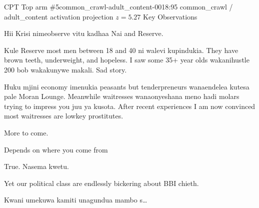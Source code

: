 \begin{docbox}{CPT Top arm \#5}{common\_crawl-adult\_content-0018:95 \textbullet{} common\_crawl / adult\_content \textbullet{} activation projection $z=5.27$}
Key Observations\par Hii Krisi nimeobserve vitu kadhaa Nai and Reserve.\par Kule Reserve most men between 18 and 40 ni walevi kupindukia. They have brown teeth, underweight, and hopeless. I saw some 35+ year olds wakanihustle 200 bob wakakunywe makali. Sad story.\par Huku mjini economy imenukia peasants but tenderpreneurs wanaendelea kutesa pale Moran Lounge. Meanwhile waitresses wanaonyeshana meno hadi molars trying to impress you juu ya kusota. After recent experiences I am now convinced most waitresses are lowkey prostitutes.\par More to come.\par Depends on where you come from\par True. Nasema kwetu.\par Yet our political class are endlessly bickering about BBI chieth.\par Kwani umekuwa kamiti unagundua mambo s\ldots{}
\end{docbox}
